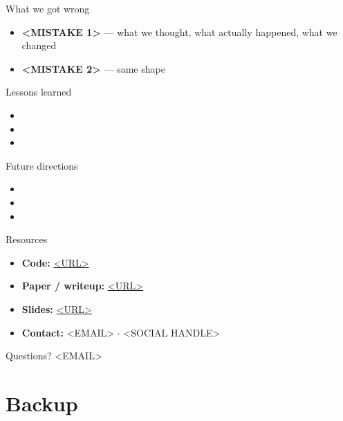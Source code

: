 \documentclass[aspectratio=169,12pt]{beamer}
\begin{document}
\begin{frame}{What we got wrong}
  \begin{itemize}
    \item \textbf{<MISTAKE 1>} --- what we thought, what actually happened, what we changed
    \item \textbf{<MISTAKE 2>} --- same shape
  \end{itemize}
\end{frame}

\begin{frame}{Lessons learned}
  \begin{itemize}
    \item <LESSON 1 --- generalizable beyond this project>
    \item <LESSON 2 --- generalizable beyond this project>
    \item <LESSON 3 --- generalizable beyond this project>
  \end{itemize}
\end{frame}

\begin{frame}{Future directions}
  \begin{itemize}
    \item <DIRECTION 1>
    \item <DIRECTION 2>
    \item <DIRECTION 3>
  \end{itemize}
\end{frame}

\begin{frame}{Resources}
  \begin{itemize}
    \item \textbf{Code:} \url{<URL>}
    \item \textbf{Paper / writeup:} \url{<URL>}
    \item \textbf{Slides:} \url{<URL>}
    \item \textbf{Contact:} <EMAIL> $\cdot$ <SOCIAL HANDLE>
  \end{itemize}
\end{frame}

\begin{frame}[plain]{Questions?}
  \vfill
  \centering
  \Large <EMAIL>
  \vfill
\end{frame}

\appendix

\section*{Backup}
\end{document}
